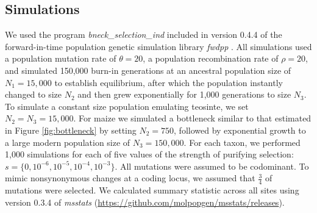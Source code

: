 \documentclass[12pt,a4paper]{article}
\begin{document}
\subsection*{Simulations}
We used the program \emph{bneck\_selection\_ind} included in version 0.4.4 of the forward-in-time population genetic simulation library \emph{fwdpp} \citep[\url{https://github.com/molpopgen/fwdpp}[]{thornton2014genetics}. 
All simulations used a population mutation rate of $\theta=20$, a population recombination rate of $\rho=20$, and simulated 150,000 burn-in generations at an ancestral population size of $N_1=15,000$ to establish equilibrium, after which the population instantly changed to size $N_2$ and then grew exponentially for 1,000 generations to size $N_3$. 
To simulate a constant size population emulating teosinte, we set $N_2=N_3=15,000$.
For maize we simulated a bottleneck similar to that estimated in Figure \ref{fig:bottleneck} by setting $N_2=750$,   followed by exponential growth to a large modern population size of $N_3=150,000$. 
For each taxon, we performed 1,000 simulations for each of five values of the strength of purifying selection: $s=\{0,10^{-6},10^{-5},10^{-4},10^{-3}\}$. 
All mutations were assumed to be codominant.
To mimic nonsynonymous changes at a coding locus, we assumed that $\frac{3}{4}$ of mutations were selected.
We calculated summary statistic across all sites using version 0.3.4 of \emph{msstats} (\url{https://github.com/molpopgen/msstats/releases}).

{\scriptsize \sf
\renewcommand{\baselinestretch}{2.0}

%

}



\onecolumn

\end{document}
